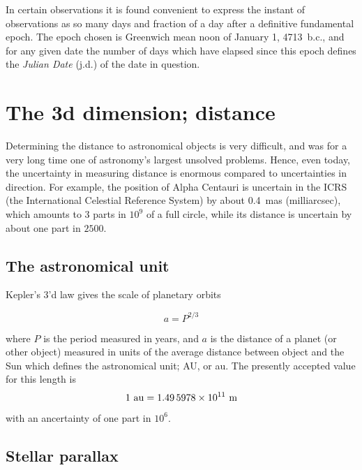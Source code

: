 In certain observations it is found convenient to express the instant of observations
as so many days and fraction of a day after a definitive fundamental epoch. The epoch
chosen is Greenwich mean noon of January 1, 4713~{\sc b.c.}, and for any given date the
number of days which have elapsed since this epoch defines the {\it Julian Date} 
({\sc j.d.}) of the date in question.

\section{The 3d dimension; distance}

Determining the distance to astronomical objects is very difficult, and was for a very
long time one of astronomy's largest unsolved problems. Hence, even today, the uncertainty 
in measuring distance is enormous compared to uncertainties in direction. For example,
the position of Alpha Centauri is uncertain in the ICRS (the International Celestial Reference
System) by about 0.4~mas (milliarcsec), which amounts to 3 parts in $10^9$ of a full circle, while
its distance is uncertain by about one part in $2500$. 

\subsection{The astronomical unit}

Kepler's 3'd law gives the scale of planetary orbits

\[ a=P^{2/3} \]

where $P$ is the period measured in years, and $a$ is the distance of a planet (or other object) 
measured in units of the average distance between object and the Sun which defines the 
astronomical unit; AU, or au. The presently accepted value for this length is
\[ 1~{\rm au}=1.49\,5978\times 10^{11}~{\rm m} \]
with an ancertainty of one part in $10^6$.

\subsection{Stellar parallax}

